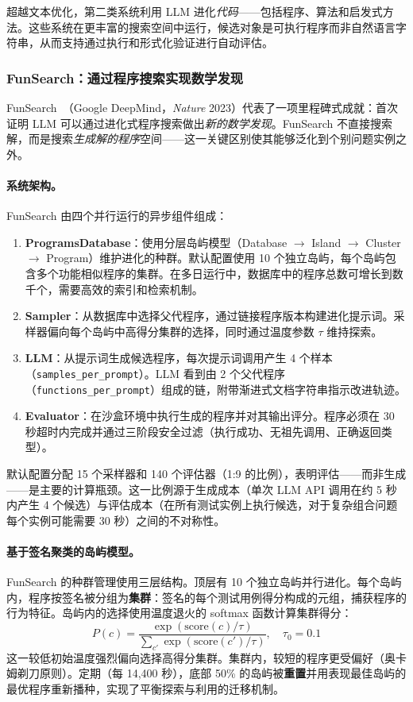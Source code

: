 超越文本优化，第二类系统利用 LLM 进化\emph{代码}——包括程序、算法和启发式方法。这些系统在更丰富的搜索空间中运行，候选对象是可执行程序而非自然语言字符串，从而支持通过执行和形式化验证进行自动评估。

\subsubsection{FunSearch：通过程序搜索实现数学发现}

FunSearch~\citep{funsearch2024}（Google DeepMind，\textit{Nature} 2023）代表了一项里程碑式成就：首次证明 LLM 可以通过进化式程序搜索做出\emph{新的数学发现}。FunSearch 不直接搜索解，而是搜索\emph{生成解的程序}空间——这一关键区别使其能够泛化到个别问题实例之外。

\paragraph{系统架构。}
FunSearch 由四个并行运行的异步组件组成：
\begin{enumerate}
    \item \textbf{ProgramsDatabase}：使用分层岛屿模型（Database $\rightarrow$ Island $\rightarrow$ Cluster $\rightarrow$ Program）维护进化的种群。默认配置使用 10 个独立岛屿，每个岛屿包含多个功能相似程序的集群。在多日运行中，数据库中的程序总数可增长到数千个，需要高效的索引和检索机制。
    \item \textbf{Sampler}：从数据库中选择父代程序，通过链接程序版本构建进化提示词。采样器偏向每个岛屿中高得分集群的选择，同时通过温度参数 $\tau$ 维持探索。
    \item \textbf{LLM}：从提示词生成候选程序，每次提示词调用产生 4 个样本（\texttt{samples\_per\_prompt}）。LLM 看到由 2 个父代程序（\texttt{functions\_per\_prompt}）组成的链，附带渐进式文档字符串指示改进轨迹。
    \item \textbf{Evaluator}：在沙盒环境中执行生成的程序并对其输出评分。程序必须在 30 秒超时内完成并通过三阶段安全过滤（执行成功、无祖先调用、正确返回类型）。
\end{enumerate}
默认配置分配 15 个采样器和 140 个评估器（1:9 的比例），表明评估——而非生成——是主要的计算瓶颈。这一比例源于生成成本（单次 LLM API 调用在约 5 秒内产生 4 个候选）与评估成本（在所有测试实例上执行候选，对于复杂组合问题每个实例可能需要 30 秒）之间的不对称性。

\paragraph{基于签名聚类的岛屿模型。}
FunSearch 的种群管理使用三层结构。顶层有 10 个独立岛屿并行进化。每个岛屿内，程序按签名被分组为\textbf{集群}：签名的每个测试用例得分构成的元组，捕获程序的行为特征。岛屿内的选择使用温度退火的 softmax 函数计算集群得分：
\begin{equation}
P(c) = \frac{\exp(\text{score}(c)/\tau)}{\sum_{c'}\exp(\text{score}(c')/\tau)}, \quad \tau_0 = 0.1
\end{equation}
这一较低初始温度强烈偏向选择高得分集群。集群内，较短的程序更受偏好（奥卡姆剃刀原则）。定期（每 14,400 秒），底部 50\% 的岛屿被\textbf{重置}并用表现最佳岛屿的最优程序重新播种，实现了平衡探索与利用的迁移机制。

